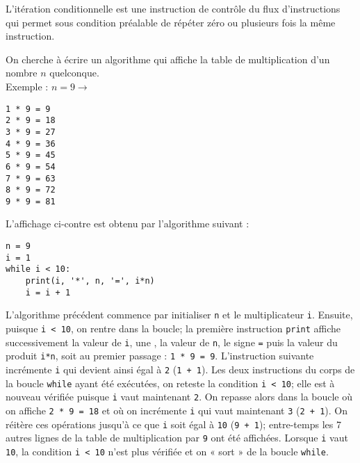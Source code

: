 \begin{defin}
L'itération conditionnelle est une instruction de contrôle du flux d'instructions
qui permet sous condition préalable de répéter zéro ou plusieurs fois la même instruction.
\end{defin}

\begin{ex}\label{ex:table}
On cherche à écrire un algorithme qui affiche la table de multiplication
d'un nombre $n$ quelconque.\\
Exemple : $n = 9 \rightarrow\ $
\begin{py}{3cm}
\begin{verbatim}
1 * 9 = 9
2 * 9 = 18
3 * 9 = 27
4 * 9 = 36
5 * 9 = 45
6 * 9 = 54
7 * 9 = 63
8 * 9 = 72
9 * 9 = 81
\end{verbatim}
\end{py}
\hfill
\begin{minipage}[t]{8cm}
L'affichage ci-contre est obtenu par l'algorithme suivant :
\begin{py}{5cm}
\begin{verbatim}
n = 9
i = 1
while i < 10:
    print(i, '*', n, '=', i*n)
    i = i + 1
\end{verbatim}
\end{py}
\end{minipage}
\end{ex}

\noindent L'algorithme précédent commence par initialiser {\tt n} et le multiplicateur {\tt i}.
Ensuite, puisque {\tt i < 10}, on rentre dans la boucle; la première instruction
{\tt print} affiche successivement la valeur de {\tt i}, une {\tt *}, 
la valeur de {\tt n}, le signe {\tt =} puis la valeur du produit {\tt i*n}, 
soit au premier passage : {\tt 1 * 9 = 9}. L'instruction suivante incrémente {\tt i} qui devient
ainsi égal à {\tt 2} ({\tt 1 + 1}). Les deux instructions du corps de la boucle {\tt while} ayant 
été exécutées, on reteste la condition {\tt i < 10}; elle est à nouveau vérifiée puisque {\tt i}
vaut maintenant {\tt 2}. On repasse alors dans la boucle où on affiche {\tt 2 * 9 = 18} et où on
incrémente {\tt i} qui vaut maintenant {\tt 3} ({\tt 2 + 1}). On réitère ces opérations jusqu'à 
ce que {\tt i} soit égal à {\tt 10} ({\tt 9 + 1}); entre-temps les 7 autres lignes de la table de 
multiplication par {\tt 9} ont été affichées. Lorsque {\tt i} vaut {\tt 10}, la condition {\tt i < 10}
n'est plus vérifiée et on « sort » de la boucle {\tt while}.

